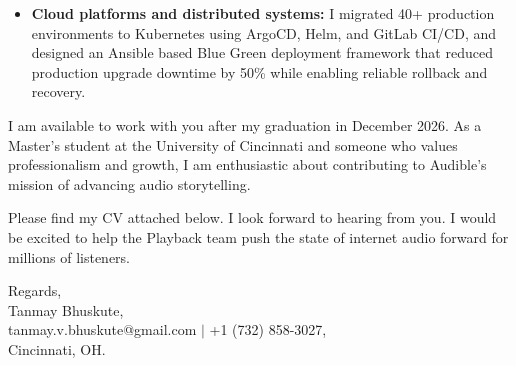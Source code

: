 \documentclass[11pt]{letter}
\begin{document}
\begin{letter}{}
\begin{itemize}[leftmargin=*, itemsep=0.45em]
    \item \textbf{Cloud platforms and distributed systems:} I migrated 40+ production environments to Kubernetes using ArgoCD, Helm, and GitLab CI/CD, and designed an Ansible based Blue Green deployment framework that reduced production upgrade downtime by 50\% while enabling reliable rollback and recovery.
\end{itemize}

I am available to work with you after my graduation in December 2026. As a Master's student at the University of Cincinnati and someone who values professionalism and growth, I am enthusiastic about contributing to Audible's mission of advancing audio storytelling.

Please find my CV attached below. I look forward to hearing from you. I would be excited to help the Playback team push the state of internet audio forward for millions of listeners.

{\setlength{\parskip}{0pt}
Regards,\\
Tanmay Bhuskute,\\
tanmay.v.bhuskute@gmail.com $\mid$ +1 (732) 858-3027,\\
Cincinnati, OH.
}

\end{letter}
\end{document}
